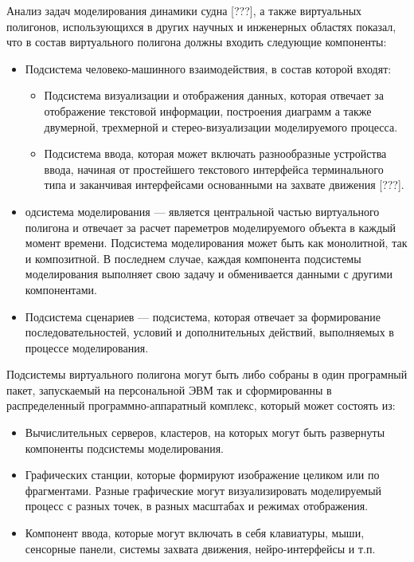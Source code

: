 Анализ задач моделирования динамики судна [???], а также виртуальных полигонов, использующихся в других научных и инженерных областях показал, что в состав виртуального полигона должны входить следующие компоненты:
\begin{itemize}
	\item   Подсистема человеко-машинного взаимодействия, в состав которой входят:
		\begin{itemize}
		\item 	Подсистема визуализации и отображения данных, 
				которая отвечает за отображение текстовой информации, 
				построения диаграмм а также двумерной, трехмерной и 
				стерео-визуализации моделируемого процесса.
		\item 	Подсистема ввода, которая может включать разнообразные 
				устройства ввода, начиная от простейшего текстового 
				интерфейса терминального типа и заканчивая интерфейсами 
				основанными на захвате движения [???].
		\end{itemize}
	\item	одсистема моделирования --- является центральной 
			частью виртуального полигона и отвечает за расчет пареметров 
			моделируемого объекта в каждый момент времени. Подсистема 
			моделирования может быть как монолитной, так и композитной. 
			В последнем случае, каждая компонента подсистемы моделирования 
			выполняет свою задачу и обменивается данными с другими компонентами.
	\item	Подсистема сценариев --- подсистема, которая отвечает за 
			формирование последовательностей, условий и дополнительных 
			действий, выполняемых в процессе моделирования.
\end{itemize}

Подсистемы виртуального полигона могут быть либо собраны в один програмный пакет, запускаемый на персональной ЭВМ так и сформированны в распределенный программно-аппаратный комплекс, который может состоять из:
\begin{itemize}
	\item 	Вычислительных серверов, кластеров, на которых 
			могут быть развернуты компоненты подсистемы моделирования.
	\item 	Графических станции, которые формируют изображение 
			целиком или по фрагментами. Разные графические могут 
			визуализировать моделируемый процесс с разных точек, 
			в разных масштабах и режимах отображения.
	\item 	Компонент ввода, которые могут включать в себя клавиатуры, 
			мыши, сенсорные панели, системы захвата движения, нейро-интерфейсы и т.п.
\end{itemize}





